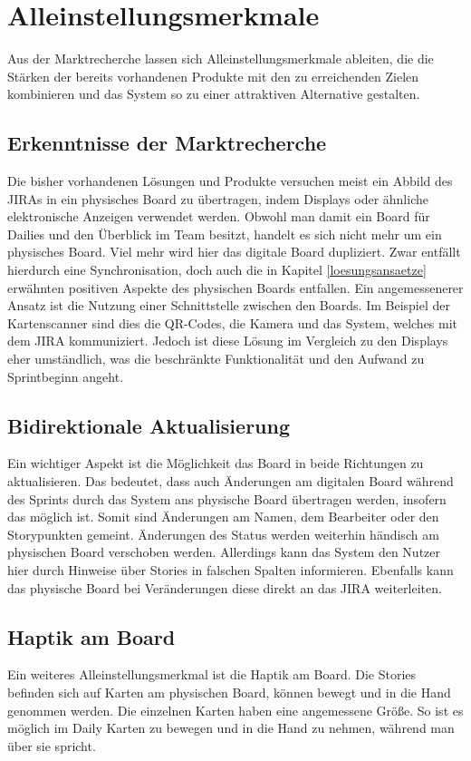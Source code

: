\documentclass[12pt,titlepage]{scrartcl}
\begin{document}
	\section{Alleinstellungsmerkmale}	
	Aus der Marktrecherche lassen sich Alleinstellungsmerkmale ableiten, die die Stärken der bereits vorhandenen Produkte mit den zu erreichenden Zielen kombinieren und das System so zu einer attraktiven Alternative gestalten.
		\subsection{Erkenntnisse der Marktrecherche}
		Die bisher vorhandenen Lösungen und Produkte versuchen meist ein Abbild des JIRAs in ein physisches Board zu übertragen, indem Displays oder ähnliche elektronische Anzeigen verwendet werden. Obwohl man damit ein Board für Dailies und den Überblick im Team besitzt, handelt es sich nicht mehr um ein physisches Board. Viel mehr wird hier das digitale Board dupliziert. Zwar entfällt hierdurch eine Synchronisation, doch auch die in Kapitel \ref{loesungsansaetze} erwähnten positiven Aspekte des physischen Boards entfallen. Ein angemessenerer Ansatz ist die Nutzung einer Schnittstelle zwischen den Boards. Im Beispiel der Kartenscanner sind dies die QR-Codes, die Kamera und das System, welches mit dem JIRA kommuniziert. Jedoch ist diese Lösung im Vergleich zu den Displays eher umständlich, was die beschränkte Funktionalität und den Aufwand zu Sprintbeginn angeht.
		\subsection{Bidirektionale Aktualisierung}
		Ein wichtiger Aspekt ist die Möglichkeit das Board in beide Richtungen zu aktualisieren. Das bedeutet, dass auch Änderungen am digitalen Board während des Sprints durch das System ans physische Board übertragen werden, insofern das möglich ist. Somit sind Änderungen am Namen, dem Bearbeiter oder den Storypunkten gemeint. Änderungen des Status werden weiterhin händisch am physischen Board verschoben werden. Allerdings kann das System den Nutzer hier durch Hinweise über Stories in falschen Spalten informieren. Ebenfalls kann das physische Board bei Veränderungen diese direkt an das JIRA weiterleiten.
		\subsection{Haptik am Board}
		Ein weiteres Alleinstellungsmerkmal ist die Haptik am Board. Die Stories befinden sich auf Karten am physischen Board, können bewegt und in die Hand genommen werden. Die einzelnen Karten haben eine angemessene Größe. So ist es möglich im Daily Karten zu bewegen und in die Hand zu nehmen, während man über sie spricht. 
\end{document}
